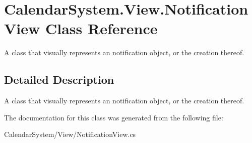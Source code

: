 \hypertarget{class_calendar_system_1_1_view_1_1_notification_view}{\section{Calendar\+System.\+View.\+Notification\+View Class Reference}
\label{class_calendar_system_1_1_view_1_1_notification_view}
}


A class that visually represents an notification object, or the creation thereof.  




\subsection{Detailed Description}
A class that visually represents an notification object, or the creation thereof. 



The documentation for this class was generated from the following file\+:\begin{DoxyCompactItemize}
\item 
Calendar\+System/\+View/Notification\+View.\+cs\end{DoxyCompactItemize}
